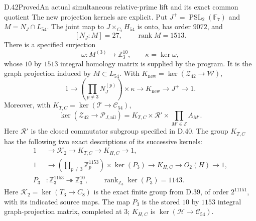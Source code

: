 \begin{statement}{D.42}{Proved}{An actual simultaneous relative-prime lift and its exact common quotient}
The new projection kernels are explicit. Put
$J^+=\operatorname{PSL}_2(\mathbb F_7)$ and
$M=N_J\cap L_{54}$. The joint map to
$J\times_{C_2}H_{54}$ is onto, has order $9072$, and
\[
 [N_J:M]=27,\qquad \operatorname{rank}M=1513.
\]
There is a specified surjection
\[
 \omega:M^{(3)}\longrightarrow\mathbb Z_3^{10},\qquad
 \kappa=\ker\omega,                                    \tag{D.42.6}
\]
whose $10$ by $1513$ integral homology matrix is
supplied by the program. It is the graph projection
induced by $M\subset L_{54}$. With
$K_{\mathrm{new}}=\ker(\mathcal Z_{42}\to\mathcal W)$,
\[
 1\longrightarrow
       \left(\prod_{p\ne3}N_J^{(p)}\right)\times\kappa
  \longrightarrow K_{\mathrm{new}}
  \longrightarrow J^+\longrightarrow1.               \tag{D.42.7}
\]
Moreover, with $K_{T,C}=\ker(\mathcal T\to\mathcal C_{54})$,
\[
 \ker(\mathcal Z_{42}\to\mathcal P_{J,\mathrm{nil}})
    =K_{T,C}\times\mathcal R'\times
                  \prod_{M'\in\mathscr S}A_{M'}.       \tag{D.42.8}
\]
Here $\mathcal R'$ is the closed commutator subgroup
specified in D.40. The group $K_{T,C}$ has the
following two exact descriptions of its successive
kernels:
\[
 \begin{split}
 1&\longrightarrow \mathcal K_2
   \longrightarrow K_{T,C}
   \longrightarrow K_{H,C}\longrightarrow1,\\
 1&\longrightarrow
    \left(\prod_{p\ne3}\mathbb Z_p^{1153}\right)
          \times\ker(P_3)
   \longrightarrow K_{H,C}
   \longrightarrow O_2(H)\longrightarrow1,\\
 P_3&:\mathbb Z_3^{1153}\twoheadrightarrow
                      \mathbb Z_3^{10},\qquad
 \operatorname{rank}_{\mathbb Z_3}\ker(P_3)=1143.
 \end{split}                                          \tag{D.42.9}
\]
Here $\mathcal K_2=\ker(T_3\to C_8)$ is the exact
finite group from D.39, of order $2^{11151}$,
with its indicated source maps. The map $P_3$ is the
stored $10$ by $1153$ integral graph-projection
matrix, completed at $3$; $K_{H,C}$ is
$\ker(\mathcal H\to\mathcal C_{54})$.


\end{statement}

